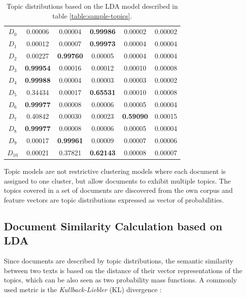 \begin{table}[!htbp]
\centering%
\begin{tabularx}{\linewidth}{CCCCCC}
\toprule
{} &  &  &  &  &  \\
\midrule
\midrule
$D_0$ & 0.00006 & 0.00004 & \textbf{0.99986} & 0.00002 & 0.00002\\
\midrule
$D_1$ & 0.00012 & 0.00007 & \textbf{0.99973} & 0.00004 & 0.00004 \\
\midrule
$D_2$ & 0.00227 & \textbf{0.99760}  & 0.00005 & 0.00004 & 0.00004\\
\midrule
$D_3$ & \textbf{0.99954} & 0.00016 & 0.00012 & 0.00010 & 0.00008 \\
\midrule
$D_4$ & \textbf{0.99988} & 0.00004 & 0.00003 & 0.00003 & 0.00002\\
\midrule
$D_5$ & 0.34434 & 0.00017 & \textbf{0.65531} & 0.00010 & 0.00008\\
\midrule
$D_6$ & \textbf{0.99977} & 0.00008 & 0.00006 & 0.00005 & 0.00004\\
\midrule
$D_7$ & 0.40842 & 0.00030 & 0.00023 & \textbf{0.59090} & 0.00015\\
\midrule
$D_8$ & \textbf{0.99977} & 0.00008 & 0.00006 & 0.00005 & 0.00004\\
\midrule
$D_9$ & 0.00017 & \textbf{0.99961} & 0.00009 & 0.00007 & 0.00006\\
\midrule
$D_{10}$ & 0.00021 & 0.37821 & \textbf{0.62143} & 0.00008 & 0.00007\\
\midrule
\bottomrule
\end{tabularx}
\caption{Topic distributions based on the LDA model described in table \ref{table:sample-topics}.}
\label{table:sample-doctopics}
\end{table}


Topic models are not restrictive clustering models where each document is assigned to one cluster, but allow documents to exhibit multiple topics. The topics covered in a set of documents are discovered from the own corpus and feature vectors are topic distributions expressed as vector of probabilities.


\subsection{Document Similarity Calculation based on LDA}\label{sec:doc-sim-lda}

Since documents are described by topic distributions, the semantic similarity between two texts is based on the distance of their vector representations of the topics, which can be also seen as two probability mass functions. A commonly used metric is the \textit{Kullback-Liebler} (KL) divergence \citep{Kullback1951, Kullback1968}:

